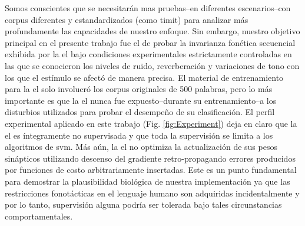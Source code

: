{Somos conscientes que se necesitarán mas pruebas--en diferentes escenarios--con corpus diferentes y estandardizados (como \gls{timit}) para analizar más profundamente las capacidades de nuestro enfoque.
Sin embargo, nuestro objetivo principal en el presente trabajo fue el de probar la invarianza fonética secuencial exhibida por la \gls{el} bajo condiciones experimentales estrictamente controladas en las que se conocieron los niveles de ruido, reverberación y variaciones de tono con los que el estímulo se afectó de manera precisa. El material de entrenamiento para la \gls{el} solo involucró los corpus originales de 500 palabras, pero lo más importante es que la \gls{el} nunca fue expuesto--durante su entrenamiento--a los disturbios utilizados para probar el desempeño de su clasificación. El perfil experimental aplicado en este trabajo (Fig. \ref{fig:Experiment}) deja en claro que la \gls{el} es íntegramente no supervisada y que toda la supervisión se limita a los algoritmos de \gls{svm}. Más aún, la \gls{el} no optimiza la actualización de sus pesos sinápticos utilizando descenso del gradiente retro-propagando errores producidos por funciones de costo arbitrariamente insertadas. Este es un punto fundamental para demostrar la plausibilidad biológica de nuestra implementación ya que las restricciones fonotácticas en el lenguaje humano son adquiridas incidentalmente \cite{BRENT199693,saffran_1997} y por lo tanto, supervisión alguna podría ser tolerada bajo tales circunstancias comportamentales.

}
